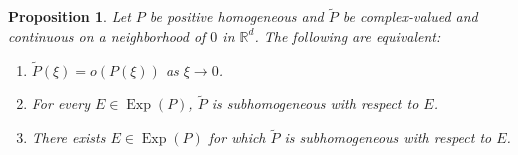 \documentclass[11pt, letter]{book}
\newtheorem{proposition}[theorem]{Proposition}
\newcommand\Exp{\operatorname{Exp}}
\begin{document}
\begin{framed}
\begin{proposition}\label{prop:Subhomequivtolittleoh}
Let $P$ be positive homogeneous and $\widetilde{P}$ be complex-valued and continuous on a neighborhood of $0$ in $\mathbb{R}^d$. The following are equivalent:
\begin{enumerate}[label=(\alph*), ref=(\alph*)]
    \item\label{item:Subhomequivtolittleoh1} $\widetilde{P}(\xi)=o(P(\xi))$ as $\xi\to 0$.
    \item\label{item:Subhomequivtolittleoh2} For every $E\in\Exp(P)$, $\widetilde{P}$ is subhomogeneous with respect to $E$.
    \item\label{item:Subhomequivtolittleoh3} There exists $E\in\Exp(P)$ for which $\widetilde{P}$ is subhomogeneous with respect to $E$.
\end{enumerate}
\end{proposition}
\end{framed}
\end{document}
